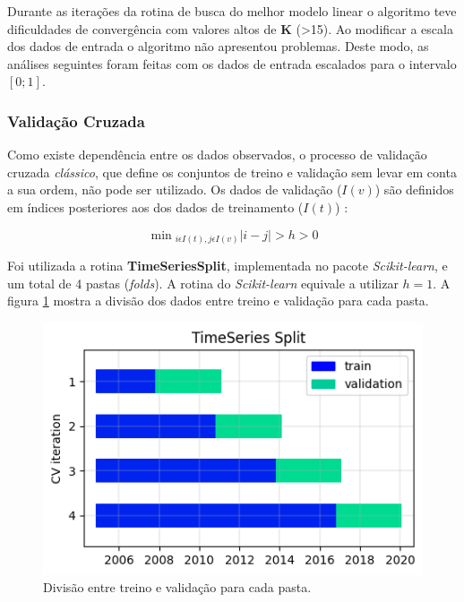 \documentclass[final,5p]{elsarticle}
\numberwithin{equation}{section}
\begin{document}
    Durante as iterações da rotina de busca do melhor modelo linear o algoritmo teve dificuldades de convergência com valores altos de \textbf{K} (>15). Ao modificar a escala dos dados de entrada o algoritmo não apresentou problemas. Deste modo, as análises seguintes foram feitas com os dados de entrada escalados para o intervalo $[0;1]$.

    \subsubsection{Validação Cruzada}

    Como existe dependência entre os dados observados, o processo de validação cruzada \emph{clássico}, que define os conjuntos de treino e validação sem levar em conta a sua ordem, não pode ser utilizado. Os dados de validação ($I(v)$) são definidos em índices posteriores aos dos dados de treinamento ($I(t)$) \cite{10.1214/09-SS054}:

    \begin{equation}
        \min{}_{i \epsilon I(t), j \epsilon I(v)} |i - j| > h > 0
    \end{equation}

    Foi utilizada a rotina \textbf{TimeSeriesSplit}, implementada no pacote \emph{Scikit-learn}, e um total de 4 pastas (\emph{folds}). A rotina do \emph{Scikit-learn} equivale a utilizar $h=1$. A figura \ref{fig:folds} mostra a divisão dos dados entre treino e validação para cada pasta.

    \begin{figure}[hbt!]
        \includegraphics[width=0.95\columnwidth]{B1_Folds.png}
        \caption{Divisão entre treino e validação para cada pasta.}
        \label{fig:folds}
    \end{figure}
\end{document}
